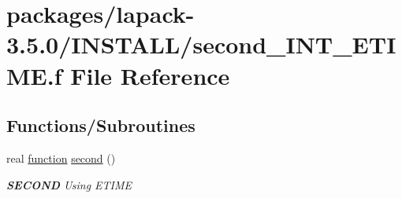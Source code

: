 \hypertarget{second__INT__ETIME_8f}{}\section{packages/lapack-\/3.5.0/\+I\+N\+S\+T\+A\+L\+L/second\+\_\+\+I\+N\+T\+\_\+\+E\+T\+I\+M\+E.f File Reference}
\label{second__INT__ETIME_8f}
\subsection*{Functions/\+Subroutines}
\begin{DoxyCompactItemize}
\item 
real \hyperlink{afunc_8m_a7b5e596df91eadea6c537c0825e894a7}{function} \hyperlink{group__auxOTHERauxiliary_gae9f971a8b343bd2fcb85c3b16da97f10}{second} ()
\begin{DoxyCompactList}\small\item\em {\bfseries S\+E\+C\+O\+N\+D} Using E\+T\+I\+M\+E \end{DoxyCompactList}\end{DoxyCompactItemize}
